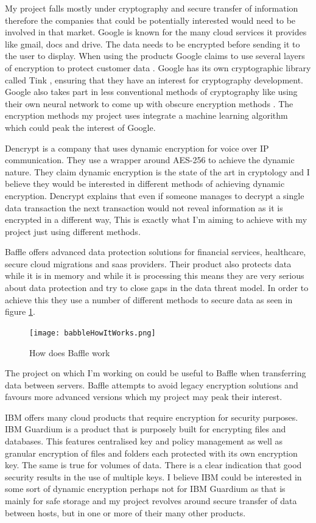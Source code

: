 %
%
%
%
My project falls mostly under cryptography and secure transfer of information therefore the companies that could be potentially interested would need to be involved in that market. 
Google is known for the many cloud services it provides like gmail, docs and drive. The data needs to be encrypted before sending it to the user to display. When using the products Google claims to use several layers of encryption to protect customer data \cite{googleSecurity}. Google has its own cryptographic library called Tink \cite{googleTink}, ensuring that they have an interest for cryptography development. Google also takes part in less conventional methods of cryptography like using their own neural network to come up with obscure encryption methods \cite{GoogleAi1}. The encryption methods my project uses integrate a machine learning algorithm which could peak the interest of Google.

Dencrypt \cite{dencrypt} is a company that uses dynamic encryption for voice over IP communication. They use a wrapper around AES-256 to achieve the dynamic nature. They claim dynamic encryption is the state of the art in cryptology and I believe they would be interested in different methods of achieving dynamic encryption. Dencrypt explains that even if someone manages to decrypt a single data transaction the next transaction would not reveal information as it is encrypted in a different way, This is exactly what I'm aiming to achieve with my project just using different methods. 

Baffle \cite{Company_baffle} offers advanced data protection solutions for financial services, healthcare, secure cloud migrations and saas providers. Their product also protects data while it is in memory and while it is processing this means they are very serious about data protection and try to close gaps in the data threat model. In order to achieve this they use a number of different methods to secure data as seen in figure \ref{fig:baffle}.
\begin{figure}[ht]
  \centering
      \texttt{[image: babbleHowItWorks.png]}
  \caption[How does Baffle work]{How does Baffle work\cite{Company_baffle}}
  \label{fig:baffle}
\end{figure}
The project on which I'm working on could be useful to Baffle when transferring data between servers. Baffle attempts to avoid legacy encryption solutions and favours more advanced versions which my project may peak their interest.

IBM offers many cloud products that require encryption for security purposes. IBM Guardium \cite{IBM_Guardium} is a product that is purposely built for encrypting files and databases. This features centralised key and policy management as well as granular encryption of files and folders each protected with its own encryption key. The same is true for volumes of data. There is a clear indication that good security results in the use of multiple keys. I believe IBM could be interested in some sort of dynamic encryption perhaps not for IBM Guardium as that is mainly for safe storage and my project revolves around secure transfer of data between hosts, but in one or more of their many other products.


